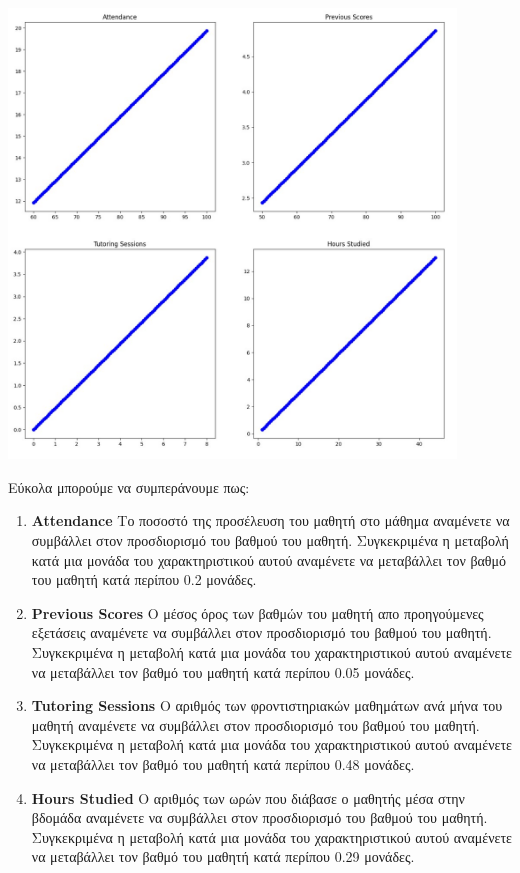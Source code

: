 \documentclass[12pt]{article}
\begin{document}
\begin{center}
    \includegraphics[width=0.89\textwidth]{./images/icon12.jpg}
    
\end{center}

Εύκολα μπορούμε να συμπεράνουμε πως: \\

\begin{enumerate}
    \item \textbf{Attendance} Το ποσοστό της προσέλευση του μαθητή στο μάθημα αναμένετε
 να συμβάλλει στον προσδιορισμό του βαθμού του μαθητή. Συγκεκριμένα η μεταβολή κατά μια μονάδα του χαρακτηριστικού αυτού αναμένετε να μεταβάλλει τον βαθμό του μαθητή κατά περίπου 0.2 μονάδες.
 
 	\item \textbf{Previous Scores} Ο μέσος όρος των βαθμών του μαθητή απο προηγούμενες εξετάσεις αναμένετε
 να συμβάλλει στον προσδιορισμό του βαθμού του μαθητή. Συγκεκριμένα η μεταβολή κατά μια μονάδα του χαρακτηριστικού αυτού αναμένετε να μεταβάλλει τον βαθμό του μαθητή κατά περίπου 0.05 μονάδες.
 
 \item \textbf{Tutoring Sessions} Ο αριθμός των φροντιστηριακών μαθημάτων ανά μήνα του μαθητή αναμένετε
 να συμβάλλει στον προσδιορισμό του βαθμού του μαθητή. Συγκεκριμένα η μεταβολή κατά μια μονάδα του χαρακτηριστικού αυτού αναμένετε να μεταβάλλει τον βαθμό του μαθητή κατά περίπου 0.48 μονάδες.
 
 \item \textbf{Hours Studied} Ο αριθμός των ωρών που διάβασε ο μαθητής μέσα στην βδομάδα αναμένετε
 να συμβάλλει στον προσδιορισμό του βαθμού του μαθητή. Συγκεκριμένα η μεταβολή κατά μια μονάδα του χαρακτηριστικού αυτού αναμένετε να μεταβάλλει τον βαθμό του μαθητή κατά περίπου 0.29 μονάδες.
 
\end{enumerate}
 
\end{document}
